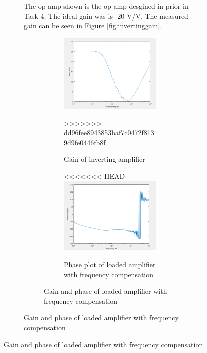 \begin{figure}[H]
\begin{subfigure}[b]{0.45\textwidth}
The op amp shown is the op amp desgined in prior in Task 4. The ideal gain was is -20 V/V. The measured gain can be seen in Figure \ref{fig:invertinggain}.
	
	
	
				\begin{figure}[H]
		\centering
		\begin{subfigure}[b]{0.45\textwidth}
			\centering
		\includegraphics[scale=.40]{ExperimentalImplementation/invertingain.png}
\caption{Gain of inverting amplifier}
\label{fig:invertinggain1}
>>>>>>> dd96fee8943853baf7c0472f8139d9fe0446fb8f
		\end{subfigure}
		\hfill
		\begin{subfigure}[b]{0.45\textwidth}
			\centering
<<<<<<< HEAD
			\includegraphics[scale=.40]{ExperimentalImplementation/phasewithcomp.png}
			\caption{Phase plot of loaded amplifier with frequency compensation}
			\label{fig:phasewithcomp}
		\end{subfigure}
		\caption{Gain and phase of loaded amplifier with frequency compensation}
		\label{fig:loadampfreq}
	\end{figure} 
	

\end{subfigure}
\end{figure}
